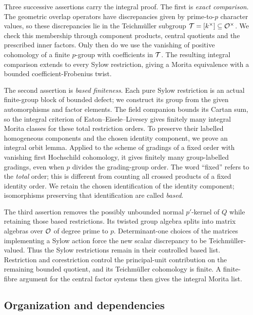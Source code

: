 Three successive assertions carry the integral proof.  The first is
\emph{exact comparison}.  The geometric overlap operators have
discrepancies given by prime-to-$p$ character values, so these
discrepancies lie in the Teichm\"uller subgroup
$\mathcal T=[k^\times]\subseteq\mathcal O^\times$.  We check this membership through
component products, central quotients and the prescribed inner
factors.  Only then do we use the vanishing of positive cohomology
of a finite $p$-group with coefficients in $\mathcal T$.  The resulting
integral comparison extends to every Sylow restriction, giving a
Morita equivalence with a bounded coefficient-Frobenius twist.

The second assertion is \emph{based finiteness}.  Each pure Sylow
restriction is an actual finite-group block of bounded defect; we
construct its group from the given automorphisms and factor elements.
The field companion bounds its Cartan sum, so the integral
criterion of Eaton--Eisele--Livesey gives finitely many integral Morita
classes for these total restriction orders.  To preserve their
labelled homogeneous components and the chosen identity component, we
prove an integral orbit lemma.  Applied to the scheme of gradings of
a fixed order with vanishing first Hochschild cohomology, it gives
finitely many group-labelled gradings, even when $p$ divides the
grading-group order.  The word ``fixed'' refers to the \emph{total}
order; this is different from counting all crossed products of a fixed
identity order.  We retain the chosen identification of the identity
component; isomorphisms preserving that identification are called
\emph{based}.

The third assertion removes the possibly unbounded normal $p'$-kernel
of $Q$ while retaining those based restrictions.
Its twisted group algebra splits into matrix algebras over $\mathcal O$ of
degree prime to $p$.  Determinant-one choices of the matrices
implementing a Sylow action force the new scalar discrepancy to be
Teichm\"uller-valued.  Thus the Sylow restrictions remain in their
controlled based list.  Restriction and corestriction control the
principal-unit contribution on the remaining bounded quotient, and
its Teichm\"uller cohomology is finite.  A finite-fibre argument for
the central factor systems then gives the integral Morita list.

\subsection{Organization and dependencies}

